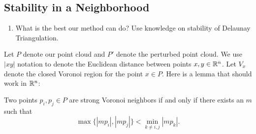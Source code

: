 \documentclass[letterpaper,titlepage]{article}
\begin{document}
\subsection{Stability in a Neighborhood}
\begin{enumerate}
    \item What is the best our method can do? Use knowledge on stability of Delaunay Triangulation.
\end{enumerate}
    Let $P$ denote our point cloud and $P'$ denote the perturbed point cloud. We use $|xy|$ notation to denote the Euclidean distance between points $x,y \in \mathbb{R}^n$. Let $V_x$ denote the closed Voronoi region for the point $x \in P$. Here is a lemma that should work in $\mathbb{R}^n$:
    \begin{lem}\label{paperlemma}
    Two points $p_i,p_j \in P$ are strong Voronoi neighbors if and only if there exists an $m$ such that
    $$\max\{|mp_i|,|mp_j|\} < \min_{k \neq i,j}|mp_k|.$$
    \end{lem}
    
\end{document}
